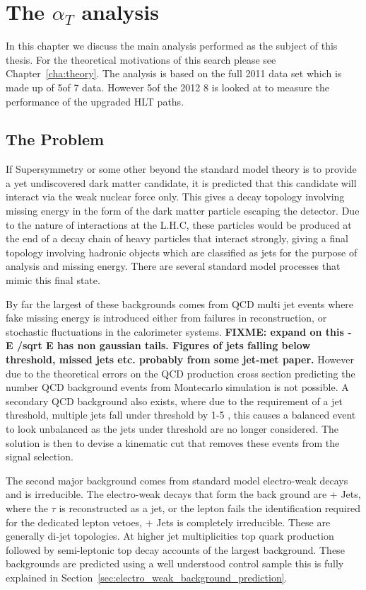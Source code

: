 \chapter{The $\alpha_{T}$ analysis} %
\label{cha:the_t_analysis}
In this chapter we discuss the main analysis performed as the subject of this 
thesis. For the theoretical motivations of this search please see 
Chapter~\ref{cha:theory}. The analysis is based on the full 2011 data set which is made up of 5\fbinv of 7 \TeV data. However 5\fbinv of the 2012 8 \TeV is looked at to measure the performance of the upgraded \alt HLT paths.
\section{The Problem} %
\label{sec:the_problem}
If Supersymmetry or some other beyond the standard model theory is to provide a 
yet undiscovered dark matter candidate, it is predicted that this candidate 
will interact via the weak nuclear force only. This gives a decay topology 
involving missing energy in the form of the dark matter particle escaping the 
detector. Due to the nature of interactions at the L.H.C, these particles would 
be produced at the end of a decay chain of heavy particles that interact 
strongly, giving a final topology involving hadronic objects which are 
classified as jets for the purpose of analysis and missing energy.
There are several standard model processes that mimic this final state.

By far the largest of these backgrounds comes from QCD multi jet events where 
fake missing energy is introduced either from failures in reconstruction, or 
stochastic fluctuations in the calorimeter systems.
\textbf{FIXME: expand on this - E /sqrt E has non gaussian tails. Figures of 
jets falling below threshold, missed jets etc. probably from some jet-met 
paper.}
However due to the theoretical errors on the QCD production cross section 
predicting the number QCD background events from Montecarlo simulation is not 
possible.
A secondary QCD background also exists, where due to the requirement of a jet 
\ET threshold, multiple jets fall under threshold by 1-5 \GeV, this causes a 
balanced event to look unbalanced as the jets under threshold are no longer 
considered. The solution is then to devise a kinematic cut that removes these 
events from the signal selection.

The second major background comes from standard model electro-weak decays and 
is irreducible. The electro-weak decays that form the back ground are 
\HepProcess{\PW\to\Ptau\Pnu} + Jets, where the $\tau$ is reconstructed as a 
jet, or the lepton fails the identification required for the dedicated lepton 
vetoes, \HepProcess{\PZ\to\Pnu\APnu} + Jets is completely irreducible. These 
are generally di-jet topologies. At higher jet multiplicities top quark 
production followed by semi-leptonic top decay accounts of the largest 
background. These backgrounds are predicted using a well understood control 
sample this is fully explained in 
Section~\ref{sec:electro_weak_background_prediction}.


